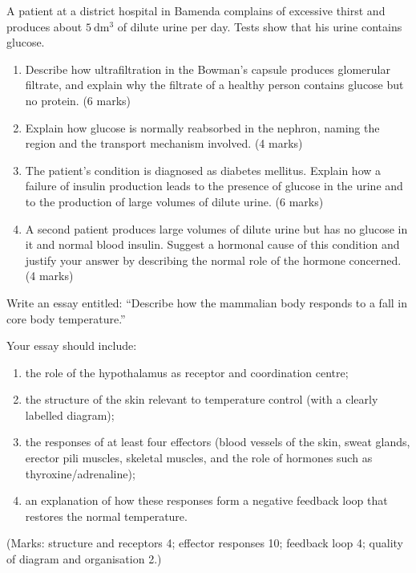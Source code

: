 \documentclass[11pt]{article}
\begin{document}
\begin{exercice}
A patient at a district hospital in Bamenda complains of excessive thirst and produces about $5\ \mathrm{dm^3}$ of dilute urine per day. Tests show that his urine contains glucose.
\begin{enumerate}
\item Describe how ultrafiltration in the Bowman's capsule produces glomerular filtrate, and explain why the filtrate of a healthy person contains glucose but no protein. \hfill (6 marks)
\item Explain how glucose is normally reabsorbed in the nephron, naming the region and the transport mechanism involved. \hfill (4 marks)
\item The patient's condition is diagnosed as diabetes mellitus. Explain how a failure of insulin production leads to the presence of glucose in the urine and to the production of large volumes of dilute urine. \hfill (6 marks)
\item A second patient produces large volumes of dilute urine but has no glucose in it and normal blood insulin. Suggest a hormonal cause of this condition and justify your answer by describing the normal role of the hormone concerned. \hfill (4 marks)
\end{enumerate}
\end{exercice}

\begin{exercice}
Write an essay entitled: ``Describe how the mammalian body responds to a fall in core body temperature.''

Your essay should include:
\begin{enumerate}
\item the role of the hypothalamus as receptor and coordination centre;
\item the structure of the skin relevant to temperature control (with a clearly labelled diagram);
\item the responses of at least four effectors (blood vessels of the skin, sweat glands, erector pili muscles, skeletal muscles, and the role of hormones such as thyroxine/adrenaline);
\item an explanation of how these responses form a negative feedback loop that restores the normal temperature.
\end{enumerate}
(Marks: structure and receptors 4; effector responses 10; feedback loop 4; quality of diagram and organisation 2.)
\end{exercice}
\end{document}
